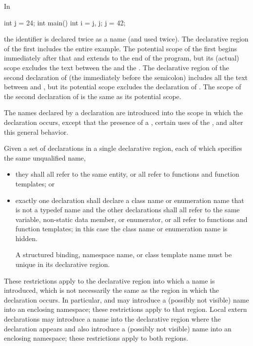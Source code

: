 \pnum
\begin{example}
In
\begin{codeblock}
int j = 24;
int main() {
  int i = j, j;
  j = 42;
}
\end{codeblock}
the identifier  is declared twice as a name (and used twice).
The declarative region of the first  includes the entire
example. The potential scope of the first  begins immediately
after that  and extends to the end of the program, but its
(actual) scope excludes the text between the \tcode{,} and the
\tcode{\}}. The declarative region of the second declaration of
 (the  immediately before the semicolon) includes all
the text between \tcode{\{} and \tcode{\}}, but its potential scope
excludes the declaration of . The scope of the second
declaration of  is the same as its potential scope.
\end{example}

\pnum
The names declared by a declaration are introduced into the scope in
which the declaration occurs, except that the presence of a
, certain uses of the
, and
 alter this general
behavior.

\pnum
Given a set of declarations in a single declarative region, each of
which specifies the same unqualified name,
\begin{itemize}
\item they shall all refer to the same entity, or all refer to functions
and function templates; or
\item exactly one declaration shall declare a class name or enumeration
name that is not a typedef name and the other declarations shall
all refer to the same variable, non-static data member, or enumerator,
or all refer to functions and function templates;
in this case the class name or enumeration name is
hidden.
\begin{note}
A structured binding,
namespace name, or
class template name
must be unique in its declarative region.
\end{note}
\end{itemize}
\begin{note}
These restrictions apply to the declarative region into which
a name is introduced, which is not necessarily the same as the region in
which the declaration occurs. In particular,
 and
 may introduce a (possibly not
visible) name into an enclosing namespace; these restrictions apply to
that region. Local extern declarations may introduce
a name into the declarative region where the declaration appears and
also introduce a (possibly not visible) name into an enclosing
namespace; these restrictions apply to both regions.
\end{note}

